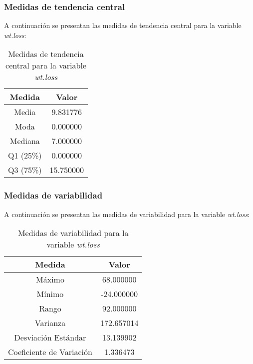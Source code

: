 \documentclass[a4paper,12pt]{article}
\begin{document}
\subsubsection*{Medidas de tendencia central}

A continuación se presentan las medidas de tendencia central para la variable \textit{wt.loss}:

\begin{table}[h!]
    \centering
    \begin{tabular}{|c|c|}
        \hline
        \textbf{Medida} & \textbf{Valor} \\
        \hline
        Media & 9.831776 \\
        \hline
        Moda & 0.000000 \\
        \hline
        Mediana & 7.000000 \\
        \hline
        Q1 (25\%) & 0.000000 \\
        \hline
        Q3 (75\%) & 15.750000 \\
        \hline
    \end{tabular}
    \caption{Medidas de tendencia central para la variable \textit{wt.loss}}
    \label{tab:medidas_tendencia_central_wt_loss}
\end{table}

\subsubsection*{Medidas de variabilidad}

A continuación se presentan las medidas de variabilidad para la variable \textit{wt.loss}:

\begin{table}[h!]
    \centering
    \begin{tabular}{|c|c|}
        \hline
        \textbf{Medida} & \textbf{Valor} \\
        \hline
        Máximo & 68.000000 \\
        \hline
        Mínimo & -24.000000 \\
        \hline
        Rango & 92.000000 \\
        \hline
        Varianza & 172.657014 \\
        \hline
        Desviación Estándar & 13.139902 \\
        \hline
        Coeficiente de Variación & 1.336473 \\
        \hline
    \end{tabular}
    \caption{Medidas de variabilidad para la variable \textit{wt.loss}}
    \label{tab:medidas_variabilidad_wt_loss}
\end{table}
\end{document}
